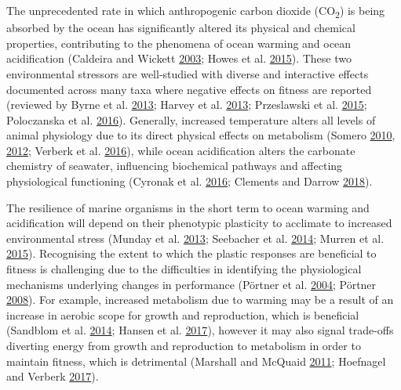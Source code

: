 \documentclass[a4paper,10pt, oneside]{memoir}
\begin{document}
The unprecedented rate in which anthropogenic carbon dioxide (CO\textsubscript{2}) is being absorbed by the ocean has significantly altered its physical and chemical properties, contributing to the phenomena of ocean warming and ocean acidification (Caldeira and Wickett \protect\hyperlink{ref-Caldeira2003}{2003}; Howes et al. \protect\hyperlink{ref-Howes2015}{2015}).
These two environmental stressors are well-studied with diverse and interactive effects documented across many taxa where negative effects on fitness are reported (reviewed by Byrne et al. \protect\hyperlink{ref-Byrne2013}{2013}; Harvey et al. \protect\hyperlink{ref-Harvey2013}{2013}; Przeslawski et al. \protect\hyperlink{ref-Przeslawski2015}{2015}; Poloczanska et al. \protect\hyperlink{ref-Poloczanska2016}{2016}).
Generally, increased temperature alters all levels of animal physiology due to its direct physical effects on metabolism (Somero \protect\hyperlink{ref-Somero2010}{2010}, \protect\hyperlink{ref-Somero2012}{2012}; Verberk et al. \protect\hyperlink{ref-Verberk2016}{2016}), while ocean acidification alters the carbonate chemistry of seawater, influencing biochemical pathways and affecting physiological functioning (Cyronak et al. \protect\hyperlink{ref-Cyronak2016}{2016}; Clements and Darrow \protect\hyperlink{ref-Clements2018}{2018}).

The resilience of marine organisms in the short term to ocean warming and acidification will depend on their phenotypic plasticity to acclimate to increased environmental stress (Munday et al. \protect\hyperlink{ref-Munday2013}{2013}; Seebacher et al. \protect\hyperlink{ref-Seebacher2014}{2014}; Murren et al. \protect\hyperlink{ref-Murren2015}{2015}).
Recognising the extent to which the plastic responses are beneficial to fitness is challenging due to the difficulties in identifying the physiological mechanisms underlying changes in performance (Pörtner et al. \protect\hyperlink{ref-Portner2004}{2004}; Pörtner \protect\hyperlink{ref-Portner2008}{2008}).
For example, increased metabolism due to warming may be a result of an increase in aerobic scope for growth and reproduction, which is beneficial (Sandblom et al. \protect\hyperlink{ref-Sandblom2014}{2014}; Hansen et al. \protect\hyperlink{ref-Hansen2017}{2017}), however it may also signal trade-offs diverting energy from growth and reproduction to metabolism in order to maintain fitness, which is detrimental (Marshall and McQuaid \protect\hyperlink{ref-Marshall2011}{2011}; Hoefnagel and Verberk \protect\hyperlink{ref-Hoefnagel2017}{2017}).
\end{document}
